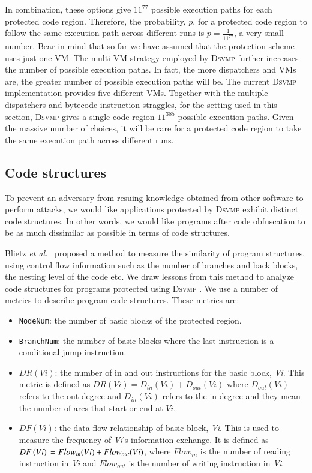 \documentclass[preprint,12pt,3p]{elsarticle}
\newcommand{\DSVMP}{\textsc{Dsvmp }}
\begin{document}
In combination, these options give $11^{77}$ possible execution paths for each protected code region.
Therefore, the probability, $p$, for a protected code region to follow the same execution path across
different runs is $p= \frac{1}{{{{11}^{77}}}}$,
a very small number.
Bear in mind that so far we have assumed that the protection scheme uses just one VM.
The multi-VM strategy employed by \DSVMP further increases the number of possible execution paths.
In fact, the more dispatchers and VMs are, the greater number of possible execution paths will be.
The current \DSVMP implementation provides five different VMs. Together with the multiple dispatchers
and bytecode instruction straggles, for the setting used in this section, \DSVMP gives a single code region
$11^{385}$ possible execution paths. Given the massive number of choices, it will be rare for
a protected code region to take the same execution path across different runs.




\subsection{Code structures}
To prevent an adversary from resuing knowledge obtained from other software to perform attacks,
we would like applications protected by \DSVMP exhibit distinct code structures. In other words,
we would like programs after code obfuscation to be as much dissimilar as possible in terms of code structures.


Blietz \emph{et al.}~\cite{18blietz2006software} proposed a method to measure the similarity of program structures,
using control flow information such as the number of branches and back blocks, the nesting level of the code etc.
We draw lessons from this method to analyze code structures for programs protected using \DSVMP.
We use a number of metrics to describe program code structures. These metrics are:

\begin{itemize}
\item \texttt{NodeNum}: the number of basic blocks of the protected region.
\item \texttt{BranchNum}: the number of basic blocks where the last instruction is a conditional jump instruction.
\item $DR(Vi)$: the number of in and out instructions for the basic block, \emph{Vi}. This metric is defined as $DR(Vi) = {D_{in}}(Vi) + {D_{out}}(Vi)$ where ${D_{out}}\left( {Vi} \right)$ refers to the out-degree and ${D_{in}}\left( {Vi} \right)$ refers to the in-degree and they mean the number of arcs that start or end at $Vi$.
\item $DF(Vi)$: the data flow relationship of basic block, \emph{Vi}. This is used to measure the frequency of \emph{Vi}'s information exchange. It is defined as $DF\left( {Vi} \right){\rm{ }} = {\rm{ }}Flo{w_{in}}(Vi) + Flo{w_{out}}(Vi)$, where $Flo{w_{in}}$ is the number of reading instruction in \emph{Vi} and $Flo{w_{out}}$ is the number of writing instruction in \emph{Vi}.
\end{itemize}
\end{document}
